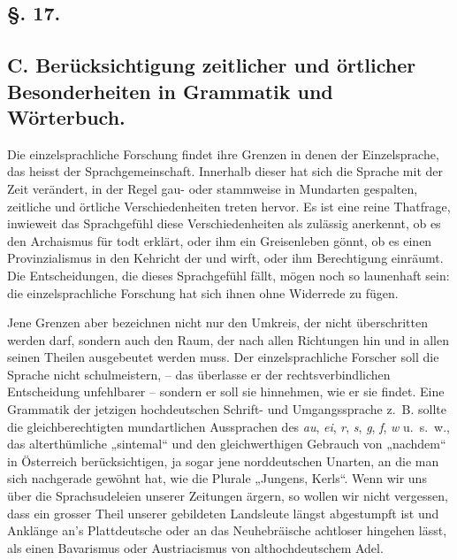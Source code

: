 \subsection*{§. 17.}\label{II.VI.17}
\subsection*{C. Berücksichtigung zeitlicher und örtlicher Besonderheiten in Grammatik und Wörterbuch.}

Die einzelsprachliche Forschung findet ihre Grenzen in denen der Einzelsprache, das heisst der Sprachgemeinschaft. Innerhalb dieser hat sich die Sprache mit der Zeit verändert, in der Regel gau- oder stammweise in Mundarten gespalten, zeitliche und örtliche Verschiedenheiten treten hervor. Es ist eine reine Thatfrage, inwieweit das Sprachgefühl diese Verschiedenheiten als zulässig anerkennt, ob es den Archaismus für todt erklärt, oder ihm ein Greisenleben gönnt, ob es einen Provinzialismus in den Kehricht der  und  wirft, oder ihm Berechtigung einräumt. Die Entscheidungen, die dieses Sprachgefühl fällt, mögen noch so launenhaft sein: die einzelsprachliche Forschung hat sich ihnen ohne Widerrede zu fügen.

Jene Grenzen aber bezeichnen nicht nur den Umkreis, der nicht überschritten werden darf, sondern auch den Raum, der nach allen Richtungen hin und in allen seinen Theilen ausgebeutet werden muss. Der einzelsprachliche Forscher soll die Sprache nicht schulmeistern, – das überlasse er der rechtsverbindlichen Entscheidung unfehlbarer  – sondern er soll sie hinnehmen, wie er sie findet. Eine Grammatik der jetzigen hochdeutschen Schrift- \label{sp.126} und Umgangssprache z.~B. sollte die gleichberechtigten mundartlichen Aussprachen des \textit{au}, \textit{ei}, \textit{r}, \textit{s}, \textit{g}, \textit{f}, \textit{w} u.~s.~w., das alterthümliche „sintemal“ und den gleichwerthigen Gebrauch von „nachdem“ in Österreich berücksichtigen, ja sogar jene norddeutschen Unarten, an die man sich nachgerade gewöhnt hat, wie die Plurale „Jungens, Kerls“. Wenn wir uns über die Sprachsudeleien unserer Zeitungen ärgern, so wollen wir nicht vergessen, dass ein grosser Theil \label{fp.134} unserer gebildeten Landsleute längst  abgestumpft ist und Anklänge an’s Plattdeutsche oder an das Neuhebräische achtloser hingehen lässt, als einen Bavarismus oder Austriacismus von althochdeutschem Adel.


